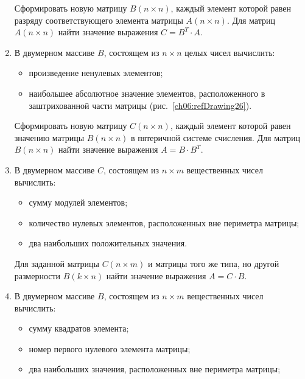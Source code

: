 \begin{enumerate}
Сформировать новую матрицу $B(n\times n)$, каждый элемент которой равен разряду
соответствующего элемента матрицы $A(n\times n)$. Для матриц $A(n\times n)$ найти
значение выражения  $C=B^T\cdot A$.



\item В двумерном массиве $B$, состоящем из $n\times n$ целых чисел вычислить:

\begin{itemize}
\item произведение ненулевых элементов;
\item наибольшее абсолютное значение элементов, расположенного в заштрихованной 
части матрицы (рис.~\ref{ch06:refDrawing26}).
\end{itemize}

Сформировать новую матрицу $C(n\times n)$, каждый элемент которой равен значению матрицы
$B(n\times n)$ в пятеричной системе счисления. Для матриц $B(n\times n)$ найти
значение выражения  $A=B\cdot B^T$.



\item В двумерном массиве $C$, состоящем из $n\times m$ вещественных чисел вычислить:

\begin{itemize}
\item сумму модулей элементов;
\item количество нулевых элементов, расположенных вне периметра матрицы;
\item два наибольших положительных значения.
\end{itemize}

Для заданной матрицы $C(n\times m)$ и матрицы того же типа, но другой размерности
$B(k\times n)$ найти значение выражения  $A=C\cdot B$.

\item В двумерном массиве $B$, состоящем из $n\times m$ вещественных чисел вычислить:

\begin{itemize}
\item сумму квадратов элемента;
\item номер первого нулевого элемента матрицы;
\item два наибольших значения, расположенных вне периметра матрицы;
\end{itemize}


\end{enumerate}
